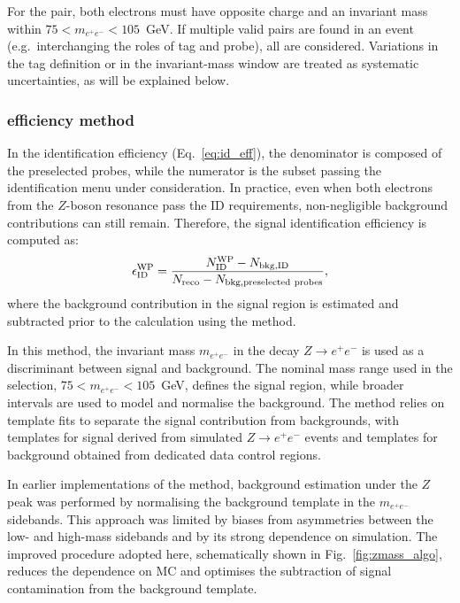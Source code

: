 For the \tp pair, both electrons must have opposite charge and an invariant mass within $75 < m_{e^+e^-} < 105$~GeV. If multiple valid pairs are found in an event (e.g.\ interchanging the roles of tag and probe), all are considered. 
Variations in the tag definition or in the invariant-mass window are treated as systematic uncertainties, as will be explained below.


\subsubsection{\zmass efficiency method}
\label{method_itself}

In the identification efficiency (Eq.~\ref{eq:id_eff}), the denominator is composed of the preselected probes, while the numerator is the subset passing the identification menu under consideration. In practice, even when both electrons from the $Z$-boson resonance pass the ID requirements, non-negligible background contributions can still remain. Therefore, the signal identification efficiency is computed as:
\begin{equation}
  \small 
  \epsilon^{\text{WP}}_{\mathrm{ID}} = \frac{N^{\mathrm{WP}}_{\mathrm{ID}} - N_{\mathrm{bkg,ID}}}{N_{\mathrm{reco}} - N_{\mathrm{bkg,preselected\ probes}}},
\label{eq:id_eff}  
\end{equation}
where the background contribution in the signal region is estimated and subtracted prior to the calculation using the \zmass method.

In this method, the invariant mass $m_{e^+e^-}$ in the decay $Z\rightarrow e^+e^-$ is used as a discriminant between signal and background. The nominal mass range used in the selection, $75 < m_{e^+e^-} < 105$~GeV, defines the signal region, while broader intervals are used to model and normalise the background. The method relies on template fits to separate the signal contribution from backgrounds, with templates for signal derived from simulated $Z\rightarrow e^+e^-$ events and templates for background obtained from dedicated data control regions.

In earlier implementations of the \zmass method, background estimation under the $Z$ peak was performed by normalising the background template in the $m_{e^+e^-}$ sidebands. This approach was limited by biases from asymmetries between the low- and high-mass sidebands and by its strong dependence on simulation. The improved procedure adopted here, schematically shown in Fig.~\ref{fig:zmass_algo}, reduces the dependence on MC and optimises the subtraction of signal contamination from the background template.

